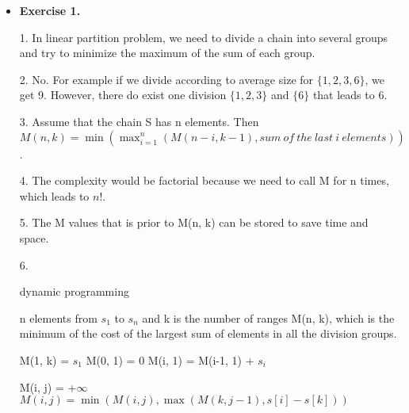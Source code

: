 \documentclass{article}
\begin{document}
\noindent

\noindent{}

\begin{itemize}

\item \textbf{Exercise 1.}

1. In linear partition problem, we need to divide a chain into several groups and try to minimize the maximum of the sum of each group.

2. No. For example if we divide according to average size for $\{1, 2, 3, 6\}$, we get 9. However, there do exist one division $\{1, 2, 3\}$ and $\{6\}$ that leads to 6.

3. Assume that the chain S has n elements. Then $M(n, k) = \min{( \max_{i = 1}^{n} (M(n-i, k-1), sum\ of\ the\ last\ i\ elements))}$.

4. The complexity would be factorial because we need to call M for n times, which leads to $n!$.

5. The M values that is prior to M(n, k) can be stored to save time and space.

6. \begin{algorithm}[H]  
    \caption{dynamic programming}  
    \begin{algorithmic}[1]  
        \Require n elements from $s_1$ to $s_n$ and k is the number of ranges
        \Ensure M(n, k), which is the minimum of the cost of the largest sum of elements in all the division groups.

            \State M(1, k) = $s_1$
        \EndFor
        \State M(0, 1) = 0
            \State M(i, 1) = M(i-1, 1) + $s_i$
        \EndFor

                M(i, j) = $+\infty$
                    \State $M(i, j) = \min{(M(i, j), \max{(M(k, j-1), s[i] - s[k])})}$
                \EndFor      
            \EndFor
        \EndFor
       
    \end{algorithmic}  
\end{algorithm}


\end{itemize}
\end{document}
